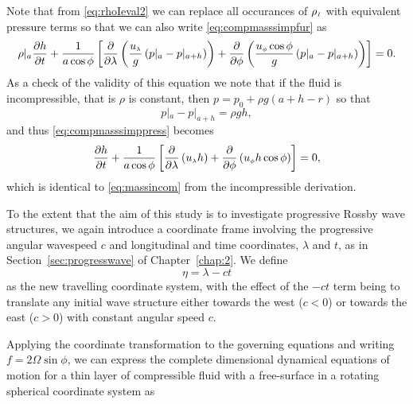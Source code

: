 Note that from \eqref{eq:rhoIeval2} we can replace all occurances of ${\rho_{\scriptscriptstyle I}}$ with equivalent pressure terms so that we can also write \eqref{eq:compmasssimpfur} as
\begin{equation}
\rho|_{a}{\frac{\partial h}{\partial t}}+\frac{1}{a\cos\phi}\left[\frac{\partial}{\partial \lambda} \left(\frac{{u_{\scriptscriptstyle \lambda}}}{g}\left( p|_a-p|_{a+h}\right) \right) +\frac{\partial}{\partial \phi} \left(\frac{{u_{\scriptscriptstyle \phi}}\cos\phi}{g}\left( p|_a-p|_{a+h}\right) \right)\right] =0. \label{eq:compmasssimppress}
\end{equation}
As a check of the validity of this equation we note that if the fluid is incompressible, that is $\rho$ is constant, then $p=p_0+\rho g (a+h-r)$ so that
\begin{equation*}
p|_a-p|_{a+h}=\rho g h,
\end{equation*}
and thus \eqref{eq:compmasssimppress} becomes
\begin{equation*}
{\ensuremath{\frac{\partial h}{\partial t}}}+\frac{1}{a\cos\phi}\left[\frac{\partial}{\partial \lambda} \left({u_{\scriptscriptstyle \lambda}} h \right) +\frac{\partial}{\partial \phi} \left({u_{\scriptscriptstyle \phi}} h \cos\phi \right)\right] =0,
\end{equation*}
which is identical to \eqref{eq:massincom} from the incompressible derivation.

To the extent that the aim of this study is to investigate progressive Rossby wave structures, we again introduce a coordinate frame involving the progressive angular wavespeed $c$ and longitudinal and time coordinates, $\lambda$ and $t$, as in Section~\ref{sec:progresswave} of Chapter~\ref{chap:2}. We define
\begin{equation*}
\eta=\lambda-c t
\end{equation*}
as the new travelling coordinate system, with the effect of the $-ct$ term being to translate any initial wave structure either towards the west ($c<0$) or towards the east ($c>0$) with constant angular speed $c$. 

Applying the coordinate transformation to the governing equations and writing $f=2\Omega\sin\phi$, we can express the complete dimensional dynamical equations of motion for a thin layer of compressible fluid with a free-surface in a rotating spherical coordinate system as 

